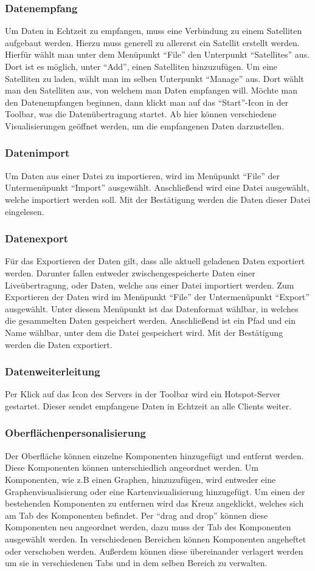 \subsubsection{Datenempfang}
Um Daten in Echtzeit zu empfangen, muss eine Verbindung zu einem Satelliten aufgebaut werden. Hierzu muss generell zu allererst ein Satellit erstellt werden. Hierfür wählt man unter dem Menüpunkt ``File'' den Unterpunkt ``Satellites'' aus. Dort ist es möglich, unter ``Add'', einen Satelliten hinzuzufügen. Um eine Satelliten zu laden, wählt man im selben Unterpunkt ``Manage'' aus. Dort wählt man den Satelliten aus, von welchem man Daten empfangen will. Möchte man den Datenempfangen beginnen, dann klickt man auf das ``Start''-Icon in der Toolbar, was die Datenübertragung startet. Ab hier können verschiedene Visualisierungen geöffnet werden, um die empfangenen Daten darzustellen.
\subsubsection{Datenimport}
Um Daten aus einer Datei zu importieren, wird im Menüpunkt ``File'' der Untermenüpunkt ``Import'' ausgewählt. Anschließend wird eine Datei ausgewählt, welche importiert werden soll. Mit der Bestätigung werden die Daten dieser Datei eingelesen.
\subsubsection{Datenexport}
Für das Exportieren der Daten gilt, dass alle aktuell geladenen Daten exportiert werden. Darunter fallen entweder zwischengespeicherte Daten einer Liveübertragung, oder Daten, welche aus einer Datei importiert werden.
Zum Exportieren der Daten wird im Menüpunkt ``File'' der Untermenüpunkt ``Export'' ausgewählt. Unter diesem Menüpunkt ist das Datenformat wählbar, in welches die gesammelten Daten gespeichert werden. Anschließend ist ein Pfad und ein Name wählbar, unter dem die Datei gespeichert wird. Mit der Bestätigung werden die Daten exportiert.
\subsubsection{Datenweiterleitung}
Per Klick auf das Icon des Servers in der Toolbar wird ein Hotspot-Server gestartet. Dieser sendet empfangene Daten in Echtzeit an alle Clients weiter.
\subsubsection{Oberflächenpersonalisierung}
Der Oberfläche können einzelne Komponenten hinzugefügt und entfernt werden. Diese Komponenten können unterschiedlich angeordnet werden. Um Komponenten, wie z.B einen Graphen, hinzuzufügen, wird entweder eine Graphenvisualisierung oder eine Kartenvisualisierung hinzugefügt. Um einen der bestehenden Komponenten zu entfernen wird das Kreuz angeklickt, welches sich am Tab des Komponenten befindet. Per ``drag and drop''  können diese Komponenten neu angeordnet werden, dazu muss der Tab des Komponenten ausgewählt werden. In verschiedenen Bereichen können Komponenten angeheftet oder verschoben werden. Außerdem können diese übereinander verlagert werden um sie in verschiedenen Tabs und in dem selben Bereich zu verwalten.
